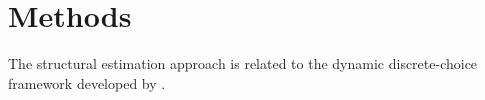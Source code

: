 \section{Methods}
The structural estimation approach is related to the dynamic
discrete-choice framework developed by \textcite{rust1987}.